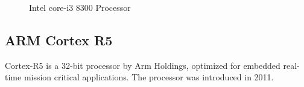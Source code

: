 \documentclass[a4paper,11pt]{article}
\begin{document}
 \begin{figure}[!h]
	\centering
	\hspace{1.5cm}
	\caption{Intel core-i3 8300 Processor}
\end{figure}
\subsection{ARM Cortex R5}
Cortex-R5 is a 32-bit processor by Arm Holdings, optimized for embedded real-time mission critical applications. The processor was introduced in 2011.\cite{WikiARM}
\end{document}
